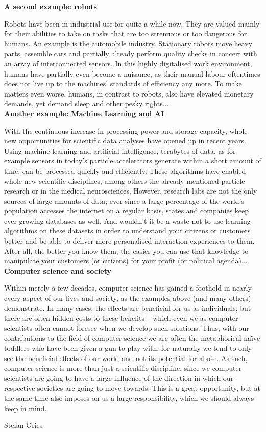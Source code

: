{    \textbf{A second example: robots}

    Robots have been in industrial use for quite a while now. They are valued mainly for their abilities to take on tasks that are too strenuous or too dangerous for humans.
    An example is the automobile industry. Stationary robots move heavy parts, assemble cars and partially already perform quality checks in concert with an array of interconnected sensors.
    In this highly digitalised work environment, humans have partially even become a nuisance, as their manual labour oftentimes does not live up to the machines' standards of efficiency any more.
    To make matters even worse, humans, in contrast to robots, also have elevated monetary demands, yet demand sleep and other pesky rights...\\

    \textbf{Another example: Machine Learning and AI}

    With the continuous increase in processing power and storage capacity, whole new opportunities for scientific data analyses have opened up in recent years.
    Using machine learning and artificial intelligence, terabytes of data, as for example sensors in today's particle accelerators generate within a short amount of time, can be processed quickly and efficiently.
    These algorithms have enabled whole new scientific disciplines, among others the already mentioned particle research or in the medical neurosciences.
    However, research labs are not the only sources of large amounts of data; ever since a large percentage of the world's population accesses the internet on a regular basis, states and companies keep ever growing databases as well.
    And wouldn't it be a waste not to use learning algorithms on these datasets in order to understand your citizens or customers better and be able to deliver more personalised interaction experiences to them.
    After all, the better you know them, the easier you can use that knowledge to manipulate your customers (or citizens) for your profit (or political agenda)...\\

    \textbf{Computer science and society}

    Within merely a few decades, computer science has gained a foothold in nearly every aspect of our lives and society, as the examples above (and many others) demonstrate.
    In many cases, the effects are beneficial for us as individuals, but there are often hidden costs to these benefits -- which even we as computer scientists often cannot foresee when we develop such solutions.
    Thus, with our contributions to the field of computer science we are often the metaphorical na\"ive toddlers who have been given a gun to play with, for naturally we tend to only see the beneficial effects of our work, and not its potential for abuse.
    As such, computer science is more than just a scientific discipline, since we computer scientists are going to have a large influence of the direction in which our respective societies are going to move towards.
    This is a great opportunity, but at the same time also imposes on us a large responsibility, which we should always keep in mind.
}
{Stefan Gries}
\newpage
